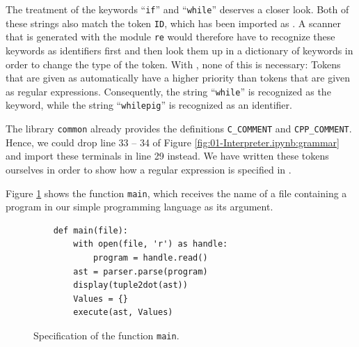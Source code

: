 \remarkEng
The treatment of the keywords ``\texttt{if}'' and ``\texttt{while}'' deserves a closer look.  Both of these
strings also match the token \texttt{ID}, which has been imported as .  A
scanner that is generated with the module \texttt{re} would therefore have to recognize these keywords as
identifiers first and then look them up in a dictionary of keywords in order to change the type of the
token.  With , none of this is necessary:  Tokens that are given as 
automatically have a higher priority than tokens that are given as regular expressions.  Consequently, the
string ``\texttt{while}'' is recognized as the keyword, while the string ``\texttt{whilepig}'' is
recognized as an identifier.  \eox

\remarkEng
The library \texttt{common} already provides the definitions \texttt{C\_COMMENT} and \texttt{CPP\_COMMENT}.
Hence, we could drop line 33 -- 34 of Figure \ref{fig:01-Interpreter.ipynb:grammar} and import these
terminals in line 29 instead.  We have written these tokens ourselves in order to show how a
regular expression is specified in .  \eox
\vspace*{0.2cm}

\noindent
Figure \ref{fig:Interpreter.ipynb:main} shows the function \texttt{main}, which receives the name of a
file containing a program in our simple programming language as its argument.

\begin{figure}[!ht]
\centering
\begin{verbatim}
    def main(file):
        with open(file, 'r') as handle:
            program = handle.read()
        ast = parser.parse(program)
        display(tuple2dot(ast))
        Values = {}
        execute(ast, Values)
\end{verbatim}
\vspace*{-0.3cm}
\caption{Specification of the function \texttt{main}.}
\label{fig:Interpreter.ipynb:main}
\end{figure}

